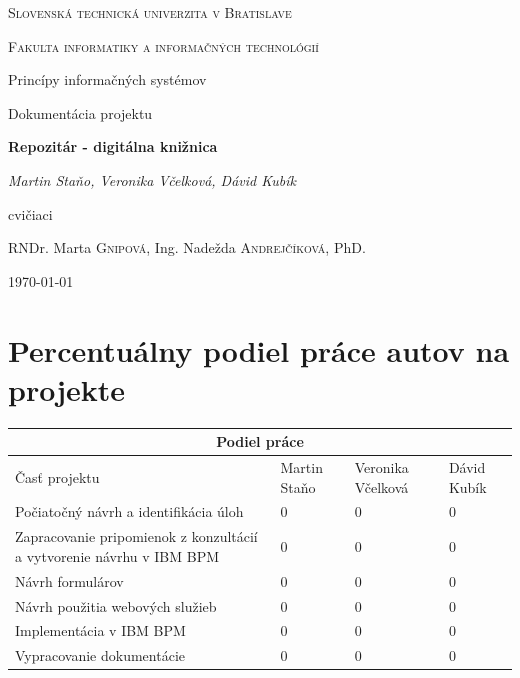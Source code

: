\documentclass[10pt,oneside,slovak,a4paper]{article}
\begin{document}
\begin{titlepage}
	\centering
	\par\vspace{1cm}
	{\scshape\LARGE Slovenská technická univerzita v Bratislave \par}
	{\scshape\Large Fakulta informatiky a informačných technológií\par}
	\vspace{1.5cm}
	{\large Princípy informačných systémov \par}
	{\large Dokumentácia projektu\par}
	\vspace{5cm}
	{\huge\bfseries Repozitár - digitálna knižnica\par}
	\vspace{0.5cm}
	{\Large\itshape Martin Staňo, Veronika Včelková, Dávid Kubík\par}
	\vfill
	cvičiaci\par
	RNDr. Marta \textsc{Gnipová}, Ing. Nadežda \textsc{Andrejčíková}, PhD.\par
	\vspace{1cm}
	{\large \today\par}
\end{titlepage}

\tableofcontents

\newpage


\section{Percentuálny podiel práce autov na projekte}

\vspace{1cm}

\begin{tabular}{ |p{3cm}||p{2.5cm}|p{3cm}|p{2.5cm}|}
 \hline
 \multicolumn{4}{|c|}{\textbf{Podiel práce}} \\
 \hline
 Časť projektu & Martin Staňo & Veronika Včelková & Dávid Kubík\\
 \hline
 Počiatočný návrh a identifikácia úloh & 0 & 0 &  0\\
 \hline
 Zapracovanie pripomienok z konzultácií a vytvorenie návrhu v IBM BPM & 0 & 0 &  0\\
 \hline
 Návrh formulárov & 0 & 0 &  0\\
 \hline
 Návrh použitia webových služieb & 0 & 0 &  0\\
 \hline
 Implementácia v IBM BPM & 0 & 0 &  0\\
 \hline
 Vypracovanie dokumentácie & 0 & 0 &  0\\
 
 \hline
\end{tabular}
\end{document}
